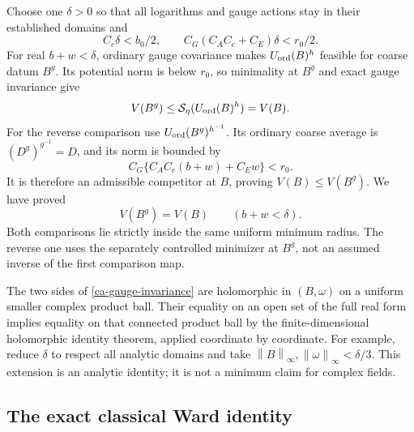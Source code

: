 \documentclass[11pt]{article}
\theoremstyle{remark}
\newcommand{\norm}[1]{\left\|#1\right\|}
\begin{document}
Choose one $\delta>0$ so that all logarithms and gauge actions
stay in their established domains and
\begin{equation}\label{ca-comparison-margins}
 C_c\delta<b_0/2,\qquad
 C_G(C_AC_c+C_E)\delta<r_0/2.
\end{equation}
For real $b+w<\delta$, ordinary gauge covariance makes
$U_{\rm ord}(B)^h$ feasible for coarse datum $B^g$.
Its potential norm is below $r_0$, so minimality at $B^g$
and exact gauge invariance give
\[
 V(B^g)\le\mathcal S_\eta(U_{\rm ord}(B)^h)=V(B).
\]
For the reverse comparison use
$U_{\rm ord}(B^g)^{h^{-1}}$. Its ordinary coarse average is
$(D^g)^{g^{-1}}=D$, and its norm is bounded by
\[
 C_G\{C_AC_c(b+w)+C_Ew\}<r_0.
\]
It is therefore an admissible competitor at $B$, proving
$V(B)\le V(B^g)$. We have proved
\begin{equation}\label{ca-gauge-invariance}
 \boxed{\qquad V(B^g)=V(B)\qquad(b+w<\delta).\qquad}
\end{equation}
Both comparisons lie strictly inside the same uniform minimum
radius. The reverse one uses the separately controlled minimizer
at $B^g$, not an assumed inverse of the first comparison map.

The two sides of \eqref{ca-gauge-invariance} are holomorphic
in $(B,\omega)$ on a uniform smaller complex product ball.
Their equality on an open set of the full real form implies
equality on that connected product ball by the finite-dimensional
holomorphic identity theorem, applied coordinate by coordinate.
For example, reduce $\delta$ to respect all analytic domains
and take $\norm B_\infty,\norm\omega_\infty<\delta/3$.
This extension is an analytic identity; it is not a minimum
claim for complex fields.

\subsection{The exact classical Ward identity}
\label{ca-ward-section}
\end{document}
